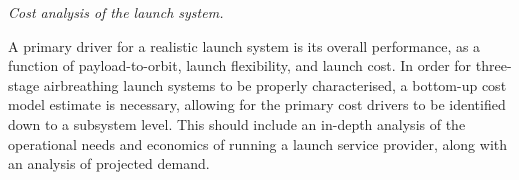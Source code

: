 \vspace{10pt}
 \textit{Cost analysis of the launch system.}

 \noindent
A primary driver for a realistic launch system is its overall performance, as a function of payload-to-orbit, launch flexibility, and launch cost. In order for three-stage airbreathing launch systems to be properly characterised, a bottom-up cost model estimate is necessary, allowing for the primary cost drivers to be identified down to a subsystem level. This should include an in-depth analysis of the operational needs and economics of running a launch service provider, along with an analysis of projected demand.





